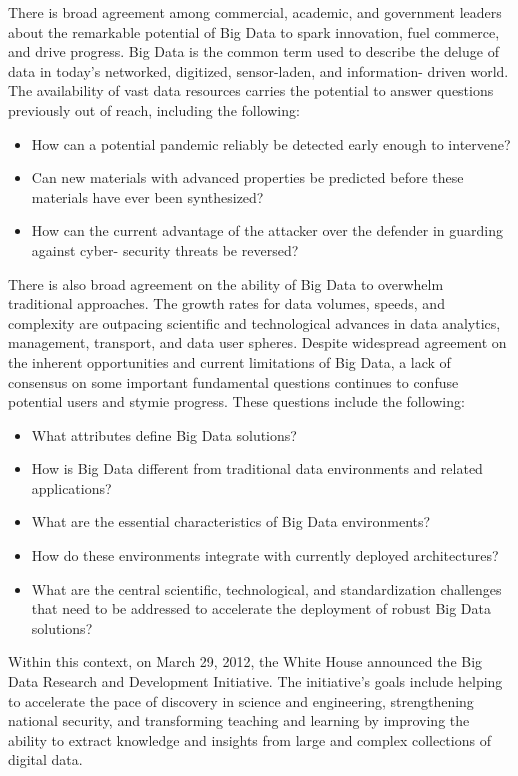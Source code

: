 \documentclass[11pt]{article}
\begin{document}
There is broad agreement among commercial, academic, and government leaders about the remarkable 
potential of Big Data to spark innovation, fuel commerce, and drive progress. Big Data is the common 
term used to describe the deluge of data in today’s networked, digitized, sensor-laden, and information-
driven world. The availability of vast data resources carries the potential to answer questions previously 
out of reach, including the following:

\begin{itemize}
\item	How can a potential pandemic reliably be detected early enough to intervene? 
\item	Can new materials with advanced properties be predicted before these materials have ever been 
synthesized? 
\item	How can the current advantage of the attacker over the defender in guarding against cyber-
security threats be reversed? 
\end{itemize}



There is also broad agreement on the ability of Big Data to overwhelm traditional approaches. The growth 
rates for data volumes, speeds, and complexity are outpacing scientific and technological advances in data 
analytics, management, transport, and data user spheres. 
Despite widespread agreement on the inherent opportunities and current limitations of Big Data, a lack of 
consensus on some important fundamental questions continues to confuse potential users and stymie 
progress. These questions include the following: 

\begin{itemize}
\item	What attributes define Big Data solutions? 
\item	How is Big Data different from traditional data environments and related applications? 
\item	What are the essential characteristics of Big Data environments? 
\item	How do these environments integrate with currently deployed architectures? 
\item	What are the central scientific, technological, and
standardization challenges that need to be  addressed to accelerate the deployment of robust Big Data solutions?
\end{itemize}



Within this context, on March 29, 2012, the White House announced the Big Data Research and 
Development Initiative.  The initiative’s goals include helping to accelerate the pace of discovery in 
science and engineering, strengthening national security, and transforming teaching and learning by 
improving the ability to extract knowledge and insights from large and complex collections of digital 
data.
\end{document}
